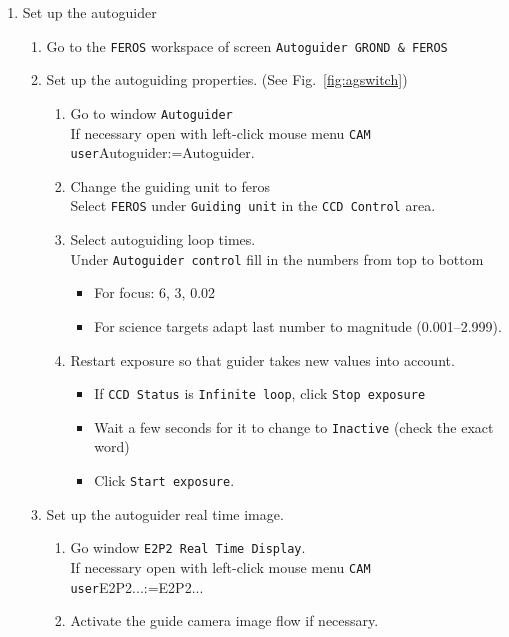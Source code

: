 \documentclass[11pt,fleqn]{book} %
\makeatletter
\def\menu#1#2{\texttt{#1}\ifx{}#2\else\@for\@x:=#2\do{$\rightarrow$\texttt{\@x}}\fi}
\def\mmenu#1#2{left-click mouse menu \menu{#1}{#2}}
\makeatother
\begin{document}
\begin{enumerate}
\begin{enumerate}
  \end{enumerate}
  \item Set up the autoguider\label{list:autoguiderFeros} 
  \begin{enumerate}
    \item Go to the \texttt{FEROS} workspace of screen \texttt{Autoguider GROND \& FEROS}
    \item Set up the autoguiding properties. (See Fig.~\ref{fig:agswitch})
    \begin{enumerate}
      \item Go to window \texttt{Autoguider}\\
            If necessary open with \mmenu{CAM user}{Autoguider}.
      \item Change the guiding unit to \gls{feros}\\
            Select \texttt{FEROS} under \texttt{Guiding unit} in the \texttt{CCD Control} area. 
      \item Select autoguiding loop times.\\
            Under \texttt{Autoguider control} fill in the numbers from top to bottom
      \begin{itemize}
        \item For focus: 6, 3, 0.02
        \item For science targets adapt last number to magnitude (0.001--2.999).
      \end{itemize}
      \item Restart exposure so that guider takes new values into account.
      \begin{itemize}
        \item If \texttt{CCD Status} is \texttt{Infinite loop}, click \texttt{Stop exposure}
        \item Wait a few seconds for it to change to \texttt{Inactive} (check the exact word)%
        \item Click \texttt{Start exposure}.
      \end{itemize}
    \end{enumerate}
    \item Set up the autoguider real time image.
    \begin{enumerate}
      \item Go window \texttt{E2P2 Real Time Display}.\\
            If necessary open with \mmenu{CAM user}{E2P2...} 
      \item Activate the guide camera image flow if necessary.\\

\end{enumerate}
\end{enumerate}
\end{enumerate}
\end{document}
